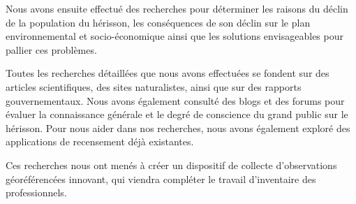 Nous avons ensuite effectué des recherches pour déterminer les raisons du déclin de la population du hérisson, les conséquences de son déclin sur le plan environnemental et socio-économique ainsi que les solutions envisageables pour pallier ces problèmes.  

Toutes les recherches détaillées que nous avons effectuées se fondent sur des articles scientifiques, des sites naturalistes, ainsi que sur des rapports gouvernementaux. Nous avons également consulté des blogs et des forums pour évaluer la connaissance générale et le degré de conscience du grand public sur le hérisson. Pour nous aider dans nos recherches, nous avons également exploré des applications de recensement déjà existantes.  

Ces recherches nous ont menés à créer un dispositif de collecte d’observations géoréférencées innovant, qui viendra compléter le travail d’inventaire des professionnels. 
